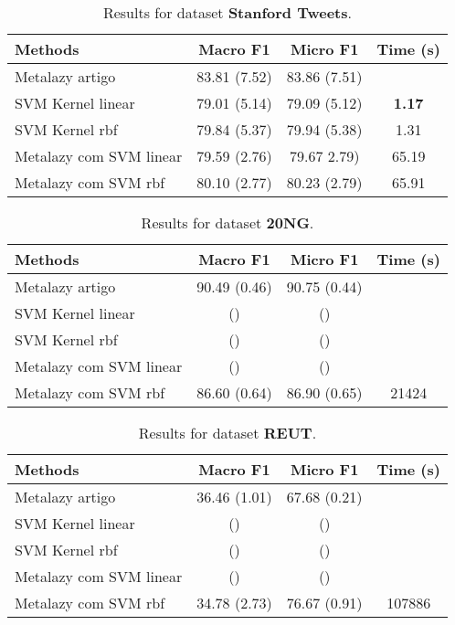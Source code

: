 \documentclass{article}
\begin{document}
	\begin{table}[ht]
		\small
		\centering	
		\begin{tabular}{l c c c}	
			\toprule
			\textbf{Methods} & \textbf{Macro F1} & \textbf{Micro F1} & \textbf{Time (s)} \\
			\midrule    
			Metalazy artigo & 83.81 (7.52) & 83.86 (7.51) & \\
			SVM Kernel linear & 79.01 (5.14) & 79.09 (5.12) & \textbf{1.17}\\
			SVM Kernel rbf &  79.84 (5.37) & 79.94 (5.38) & 1.31\\
			Metalazy com SVM linear & 79.59 (2.76)  & 79.67 2.79) & 65.19 \\	
			Metalazy com SVM rbf & 80.10 (2.77) & 80.23 (2.79) & 65.91\\	
			\bottomrule 
		\end{tabular}
		\caption{Results for dataset \textbf{Stanford Tweets}.}
		\label{tab:dataset_Stanford Tweets}
	\end{table}

		\begin{table}[t]
		\small
		\centering	
		\begin{tabular}{l c c c}	
			\toprule
			\textbf{Methods} & \textbf{Macro F1} & \textbf{Micro F1} & \textbf{Time (s)} \\
			\midrule    
			Metalazy artigo &  90.49 (0.46) &  90.75 (0.44) & \\
			SVM Kernel linear &  () &  () & \\
			SVM Kernel rbf &   () &  () & \\
			Metalazy com SVM linear &  ()  &  () &  \\	
			Metalazy com SVM rbf & 86.60 (0.64)  & 86.90 (0.65) & 21424\\	
			\bottomrule 
		\end{tabular}
		\caption{Results for dataset \textbf{20NG}.}
		\label{tab:dataset_20NG}
	\end{table}



	\begin{table}[t]
		\small
		\centering	
		\begin{tabular}{l c c c}	
			\toprule
			\textbf{Methods} & \textbf{Macro F1} & \textbf{Micro F1} & \textbf{Time (s)} \\
			\midrule    
			Metalazy artigo &  36.46 (1.01) &  67.68 (0.21) & \\
			SVM Kernel linear &  () &  () & \\
			SVM Kernel rbf &   () &  () & \\
			Metalazy com SVM linear &  ()  &  () &  \\	
			Metalazy com SVM rbf & 34.78 (2.73)  & 76.67 (0.91) & 107886\\	
			\bottomrule 
		\end{tabular}
		\caption{Results for dataset \textbf{REUT}.}
		\label{tab:dataset_reut}
	\end{table}
\end{document}
